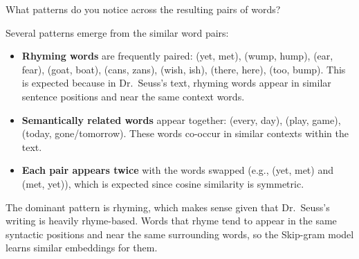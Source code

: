 \problem[2]
What patterns do you notice across the resulting pairs of words?
\begin{solution}
Several patterns emerge from the similar word pairs:

\begin{itemize}
\item \textbf{Rhyming words} are frequently paired: (yet, met), (wump, hump), (ear, fear), (goat, boat), (cans, zans), (wish, ish), (there, here), (too, bump). This is expected because in Dr.\ Seuss's text, rhyming words appear in similar sentence positions and near the same context words.

\item \textbf{Semantically related words} appear together: (every, day), (play, game), (today, gone/tomorrow). These words co-occur in similar contexts within the text.

\item \textbf{Each pair appears twice} with the words swapped (e.g., (yet, met) and (met, yet)), which is expected since cosine similarity is symmetric.
\end{itemize}

The dominant pattern is rhyming, which makes sense given that Dr.\ Seuss's writing is heavily rhyme-based. Words that rhyme tend to appear in the same syntactic positions and near the same surrounding words, so the Skip-gram model learns similar embeddings for them.
\end{solution}



